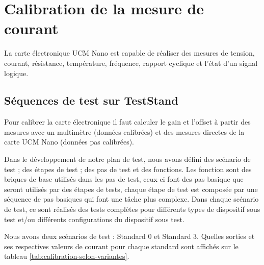 \chapter{Calibration de la mesure de courant}

La carte électronique UCM Nano est capable de réaliser des mesures de tension, courant, résistance, température, fréquence, rapport cyclique et l'état d'un signal logique. 

\section{Séquences de test sur TestStand}

Pour calibrer la carte électronique il faut calculer le gain et l'offset à partir des mesures avec un multimètre (données calibrées) et des mesures directes de la carte UCM Nano (données pas calibrées).

Dans le développement de notre plan de test, nous avons défini des scénario de test ; des étapes de test ; des pas de test et des fonctions. Les fonction sont des briques de base utilisés dans les pas de test, ceux-ci font des pas basique que seront utilisés par des étapes de tests, chaque étape de test est composée par une séquence de pas basiques qui font une tâche plus complexe. Dans chaque scénario de test, ce sont réalisés des tests complètes pour différents types de dispositif sous test et/ou différents configurations du dispositif sous test.

Nous avons deux scénarios de test : Standard 0 et Standard 3. Quelles sorties et ses respectives valeurs de courant pour chaque standard sont affichés sur le tableau \ref{tab:calibration-selon-variantes}.


